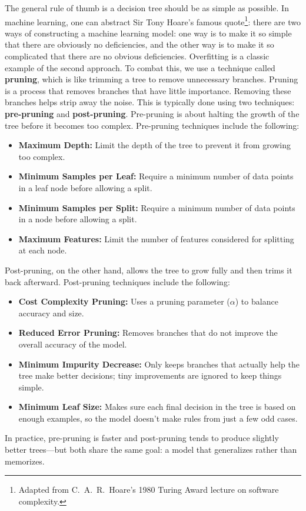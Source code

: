 The general rule of thumb is a decision tree should be as simple as possible. In machine learning, one can abstract Sir Tony Hoare's famous quote\footnote{Adapted from C.\ A.\ R.\ Hoare's 1980 Turing Award lecture on software complexity.}: there are two ways of constructing a machine learning model: one way is to make it so simple that there are obviously no deficiencies, and the other way is to make it so complicated that there are no obvious deficiencies.
Overfitting is a classic example of the second approach. To combat this, we use a technique called \textbf{pruning}, which is like trimming a tree to remove unnecessary branches.
Pruning is a process that removes branches that have little importance. Removing these branches helps strip away the noise. 
This is typically done using two techniques: \textbf{pre-pruning} and \textbf{post-pruning}.
Pre-pruning is about halting the growth of the tree before it becomes too complex.
Pre-pruning techniques include the following:
\begin{itemize}
  \item \textbf{Maximum Depth:} Limit the depth of the tree to prevent it from growing too complex.
  \item \textbf{Minimum Samples per Leaf:} Require a minimum number of data points in a leaf node before allowing a split.
  \item \textbf{Minimum Samples per Split:} Require a minimum number of data points in a node before allowing a split.
  \item \textbf{Maximum Features:} Limit the number of features considered for splitting at each node.
\end{itemize}
Post-pruning, on the other hand, allows the tree to grow fully and then trims it back afterward.
Post-pruning techniques include the following:
\begin{itemize}
  \item \textbf{Cost Complexity Pruning:} Uses a pruning parameter ($\alpha$) to balance accuracy and size.
  \item \textbf{Reduced Error Pruning:} Removes branches that do not improve the overall accuracy of the model.
  \item \textbf{Minimum Impurity Decrease:} Only keeps branches that actually help the tree make better decisions; tiny improvements are ignored to keep things simple.
  \item \textbf{Minimum Leaf Size:} Makes sure each final decision in the tree is based on enough examples, so the model doesn't make rules from just a few odd cases.
\end{itemize}
In practice, pre-pruning is faster and post-pruning tends to produce slightly better trees---but both share the same goal: a model that generalizes rather than memorizes.

